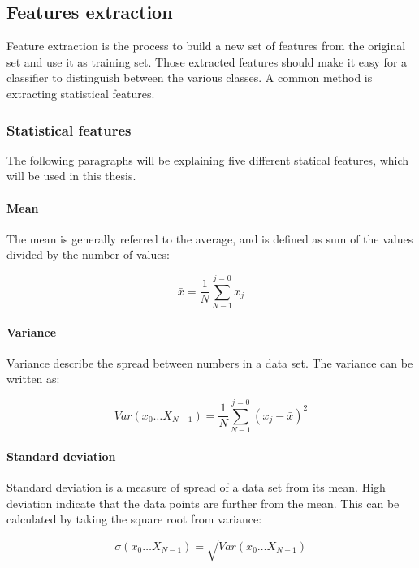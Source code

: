 \documentclass[USenglish]{ifimaster}  %
\begin{document}
\subsection{Features extraction} \label{feature_extraction}
Feature extraction is the process to build a new set of features from the original set and use it as training set. Those extracted features should make it easy for a classifier to distinguish between the various classes. A common method is extracting statistical features.
	
\subsubsection{Statistical features} \label{sub:statical}
The following paragraphs will be explaining five different statical features, which will be used in this thesis.
	
\paragraph{Mean}
The mean is generally referred to the average, and is defined as sum of the values divided by the number of values\cite{Press:2007:NRE:1403886}:
	
\begin{equation}
\bar{x} = \frac{1}{N}\sum_{N-1}^{j=0}x_{j}
\label{eq:mean}
\end{equation}
	
	
\paragraph{Variance}
Variance describe the spread between numbers in a data set. The variance can be written as\cite{Press:2007:NRE:1403886}:
	
	\begin{equation}
	Var(x_0\dotsc X_{N-1})  = \frac{1}{N}\sum_{N-1}^{j=0}(x_{j}-\bar{x})^2
	\label{eq:variance}
	\end{equation}

\paragraph{Standard deviation}
Standard deviation is a measure of spread of a data set from its mean. High deviation indicate that the data points are further from the mean. This can be calculated by taking the square root from variance\cite{Press:2007:NRE:1403886}:
	
	\begin{equation}
	\sigma(x_0\dotsc X_{N-1})  = \sqrt{Var(x_0\dotsc X_{N-1})}
	\label{eq:std}
	\end{equation}
	
\end{document}
